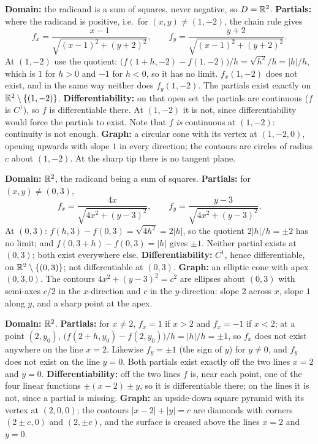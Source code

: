 \begin{solutions}
  \item \textbf{Domain:} the radicand is a sum of squares, never
        negative, so $D=\mathbb{R}^{2}$. \textbf{Partials:} where the radicand is
        positive, i.e.\ for $(x,y)\neq(1,-2)$, the chain rule gives
        \[
          f_{x}=\frac{x-1}{\sqrt{(x-1)^{2}+(y+2)^{2}}},\qquad
          f_{y}=\frac{y+2}{\sqrt{(x-1)^{2}+(y+2)^{2}}} .
        \]
        At $(1,-2)$ use the quotient:
        $\bigl(f(1+h,-2)-f(1,-2)\bigr)/h=\sqrt{h^{2}}/h=|h|/h$, which is $1$
        for $h>0$ and $-1$ for $h<0$, so it has no limit. $f_{x}(1,-2)$
        does not exist, and in the same way neither does $f_{y}(1,-2)$. The
        partials exist exactly on $\mathbb{R}^{2}\setminus\{(1,-2)\}$.
        \textbf{Differentiability:} on that open set the partials are
        continuous ($f$ is $C^{1}$), so $f$ is differentiable there. At
        $(1,-2)$ it is not, since differentiability would force the
        partials to exist. Note that $f$ \emph{is} continuous at $(1,-2)$:
        continuity is not enough. \textbf{Graph:} a circular cone with its
        vertex at $(1,-2,0)$, opening upwards with slope $1$ in every
        direction; the contours are circles of radius $c$ about $(1,-2)$.
        At the sharp tip there is no tangent plane.

  \item \textbf{Domain:} $\mathbb{R}^{2}$, the radicand being a sum of squares.
        \textbf{Partials:} for $(x,y)\neq(0,3)$,
        \[
          f_{x}=\frac{4x}{\sqrt{4x^{2}+(y-3)^{2}}},\qquad
          f_{y}=\frac{y-3}{\sqrt{4x^{2}+(y-3)^{2}}} .
        \]
        At $(0,3)$: $f(h,3)-f(0,3)=\sqrt{4h^{2}}=2|h|$, so the quotient
        $2|h|/h=\pm2$ has no limit; and $f(0,3+h)-f(0,3)=|h|$ gives
        $\pm1$. Neither partial exists at $(0,3)$; both exist everywhere
        else. \textbf{Differentiability:} $C^{1}$, hence differentiable, on
        $\mathbb{R}^{2}\setminus\{(0,3)\}$; not differentiable at $(0,3)$.
        \textbf{Graph:} an elliptic cone with apex $(0,3,0)$. The contours
        $4x^{2}+(y-3)^{2}=c^{2}$ are ellipses about $(0,3)$ with semi-axes
        $c/2$ in the $x$-direction and $c$ in the $y$-direction: slope $2$
        across $x$, slope $1$ along $y$, and a sharp point at the apex.

  \item \textbf{Domain:} $\mathbb{R}^{2}$. \textbf{Partials:} for $x\neq2$,
        $f_{x}=1$ if $x>2$ and $f_{x}=-1$ if $x<2$; at a point $(2,y_{0})$,
        $\bigl(f(2+h,y_{0})-f(2,y_{0})\bigr)/h=|h|/h=\pm1$, so $f_{x}$ does
        not exist anywhere on the line $x=2$. Likewise $f_{y}=\pm1$ (the
        sign of $y$) for $y\neq0$, and $f_{y}$ does not exist on the line
        $y=0$. Both partials exist exactly off the two lines $x=2$ and
        $y=0$. \textbf{Differentiability:} off the two lines $f$ is, near
        each point, one of the four linear functions $\pm(x-2)\pm y$, so it
        is differentiable there; on the lines it is not, since a partial
        is missing. \textbf{Graph:} an upside-down square pyramid with its
        vertex at $(2,0,0)$; the contours $|x-2|+|y|=c$ are diamonds with
        corners $(2\pm c,0)$ and $(2,\pm c)$, and the surface is creased
        above the lines $x=2$ and $y=0$.


\end{solutions}
